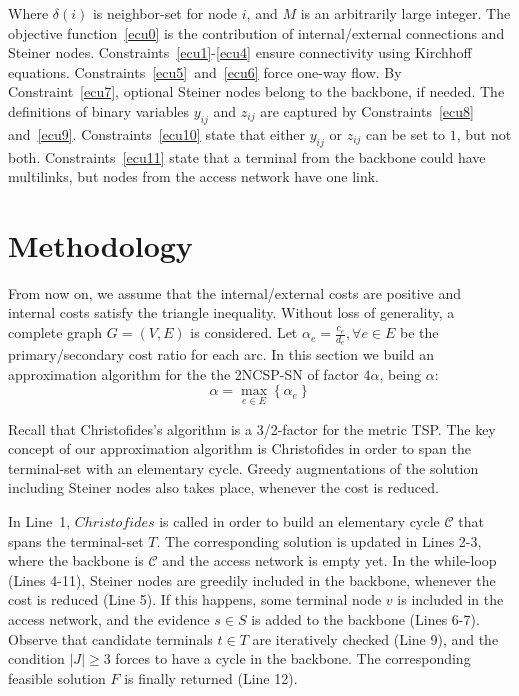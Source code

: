 \documentclass{endm}
\begin{document}
Where $\delta (i)$ is neighbor-set for node $i$, and $M$ is an arbitrarily large integer.
The objective function~\eqref{ecu0} is the contribution of internal/external connections and Steiner nodes. Constraints~\eqref{ecu1}-\eqref{ecu4} ensure connectivity using Kirchhoff equations.
Constraints~\eqref{ecu5}~and~\eqref{ecu6} force one-way flow.
By Constraint~\eqref{ecu7}, optional Steiner nodes belong to the backbone, if needed.
The definitions of binary variables $y_{ij}$ and $z_{ij}$ are captured by Constraints~\eqref{ecu8}
and~\eqref{ecu9}. Constraints~\eqref{ecu10} state that either $y_{ij}$  or $z_{ij}$ can be set to $1$, but not both. 
Constraints~\eqref{ecu11} state that a terminal from the backbone could have multilinks, but nodes from the access network have one link.

\section{Methodology}\label{AA}
From now on, we assume that the internal/external costs are positive and internal costs satisfy the triangle inequality. Without loss of generality, a complete graph $G=(V,E)$ is considered. Let $\alpha_{e}=\frac{c_e}{d_e}, \forall e \in E$ be the primary/secondary cost ratio for each arc.
In this section we build an approximation algorithm for the the 2NCSP-SN of factor $4\alpha$,
being $\alpha$:
\begin{equation}
\alpha = \max_{e\in E} \left\{\alpha_{e} \right\}
\end{equation}

Recall that Christofides's algorithm is a 3/2-factor for the metric TSP.
The key concept of our approximation algorithm is Christofides in order to span the terminal-set
with an elementary cycle. Greedy augmentations of the solution including Steiner nodes also takes place, whenever the cost is reduced.

In Line~1, $Christofides$ is called in order to build an elementary cycle $\mathcal{C}$
that spans the terminal-set $T$. The corresponding solution is updated in Lines 2-3,
where the backbone is $\mathcal{C}$ and the access network is empty yet.
In the while-loop (Lines 4-11),
Steiner nodes are greedily included in the backbone, whenever the cost is reduced (Line 5).
If this happens, some terminal node $v$ is included in the access network, and the
evidence $s \in S$ is added to the backbone (Lines 6-7). Observe that candidate terminals
$t \in T$ are iteratively checked (Line 9), and the condition $|J|\geq 3$ forces to have
a cycle in the backbone. The corresponding feasible solution $F$ is finally returned (Line 12).
\end{document}
